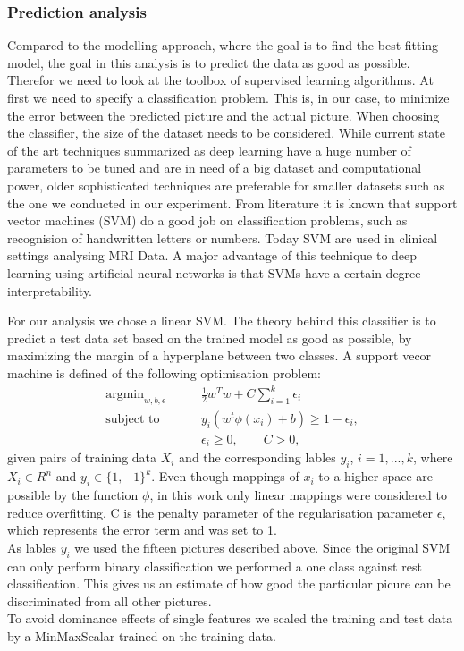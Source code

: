 \documentclass[a4paper,man,natbib,floatsintext]{apa6}
\begin{document}
\subsubsection{Prediction analysis}
Compared to the modelling approach, where the goal is to find the best fitting model, the goal in this analysis is to predict the data as good as possible. Therefor we need to look at the toolbox of supervised learning algorithms. At first we need to specify a classification problem. This is, in our case, to minimize the error between the predicted picture and the actual picture. When choosing the classifier, the size of the dataset needs to be considered. While current state of the art techniques summarized as deep learning have a huge number of parameters to be tuned and are in need of a big dataset and computational power, older sophisticated techniques are preferable for smaller datasets such as the one we conducted in our experiment. From literature it is known that support vector  machines (SVM) do a good job on classification problems, such as recognision of handwritten letters or numbers. Today SVM are used in clinical settings analysing MRI Data. A major advantage of this technique to deep learning using artificial neural networks is that SVMs have a certain degree interpretability. 


For our analysis we chose a linear SVM.  The theory behind this classifier is to predict a test data set based on the trained model as good as possible, by maximizing the margin of a hyperplane between two classes. A support vecor machine is defined of the following optimisation problem: 
\begin{align}
\text{argmin}_{w,b,\epsilon} &\qquad \frac{1}{2} w^Tw + C\sum^k_{i=1} \epsilon_i \\
\text{subject to }&\qquad   y_i(w^t\phi(x_i)+b) \geq 1-\epsilon_i, \\ & \qquad \epsilon_i \geq 0, \qquad C>0,
\end{align}
given pairs of training data $X_i$ and the corresponding lables $y_i$, $i=1,...,k$, where $X_i \in R^n$ and $y_i \in \{1,-1\}^k$. Even though mappings of $x_i$ to a higher space are possible by the function $\phi$, in this work only linear mappings were considered to reduce overfitting. C is the penalty parameter of the regularisation parameter $\epsilon$, which represents the error term and was set to 1. \\
As lables $y_i$ we used the fifteen pictures described above. Since the original SVM can only perform binary classification we performed a one class against rest classification. This gives us an estimate of how good the particular picure can be discriminated from all other pictures.\\ %
To avoid dominance effects of single features we scaled the training and test data by a MinMaxScalar trained on the training data.\\
\end{document}
